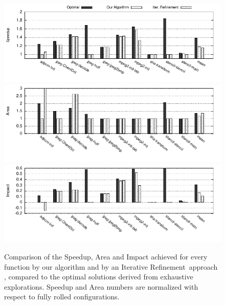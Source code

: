 \documentclass[]{usiinfthesis}
\newcommand{\ItRef}{{Iterative Refinement}}
\begin{document}
%
%
\begin{figure}[h!]
\centering
\hspace*{-1cm}
\includegraphics[width=1.1\textwidth]{figs/iter_ref_abs_speed_c90.pdf}\\
\vspace{-1em}
\hspace*{-1cm}
\includegraphics[width=1.1\textwidth]{figs/iter_ref_abs_area_c90.pdf}\\
\vspace{-1em}
\hspace*{-1cm}
\includegraphics[width=1.1\textwidth]{figs/iter_ref_abs_impact_c90.pdf}
\vspace{-2em}
\caption{Comparison of the Speedup, Area and Impact achieved for every function by our 
algorithm and by an \ItRef\ approach \cite{MarianiApr12} \cite{PalermoNov09}
\cite{XydisMar13} \cite{ZuluagaJun12}, compared to the optimal solutions derived from
exhaustive explorations. Speedup and Area numbers are normalized with respect to
fully rolled configurations.}
\vspace{2em}
\label{fig:speed_ir}
\end{figure}
\end{document}
